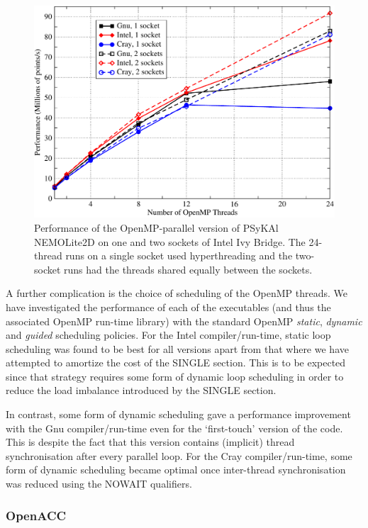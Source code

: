 \documentclass[gmdd, manuscript]{copernicus}
\newlength{\picwidth}
\begin{document}
\begin{figure}
\centering
\includegraphics[width=\picwidth]{1and2sockets}
\caption{Performance of the OpenMP-parallel version of {PS}y{KA}l
  NEMOLite2D on one and two sockets of Intel Ivy Bridge. The 24-thread
  runs on a single socket used hyperthreading and the two-socket runs
  had the threads shared equally between the sockets.}
\label{FIG_omp_2socks}
\end{figure}

A further complication is the choice of scheduling of the OpenMP
threads.  We have investigated the performance of each of the
executables (and thus the associated OpenMP run-time library) with the
standard OpenMP \textit{static}, \textit{dynamic} and \textit{guided}
scheduling policies. For the Intel compiler/run-time, static loop
scheduling was found to be best for all versions apart from that where
we have attempted to amortize the cost of the SINGLE section. This is
to be expected since that strategy requires some form of dynamic loop
scheduling in order to reduce the load imbalance introduced by the
SINGLE section.

In contrast, some form of dynamic scheduling gave a performance
improvement with the Gnu compiler/run-time even for the `first-touch'
version of the code. This is despite the fact that this version
contains (implicit) thread synchronisation after every parallel loop.
For the Cray compiler/run-time, some form of dynamic scheduling became
optimal once inter-thread synchronisation was reduced using the NOWAIT
qualifiers.

\subsubsection{OpenACC}
\end{document}
